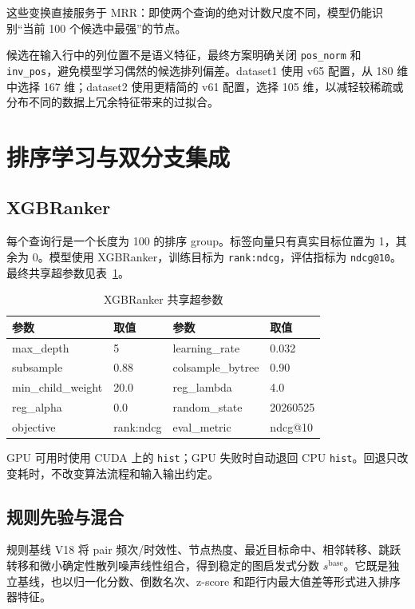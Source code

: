 \documentclass[UTF8,a4paper,11pt]{ctexart}
\begin{document}
这些变换直接服务于 MRR：即使两个查询的绝对计数尺度不同，模型仍能识别“当前 100 个候选中最强”的节点。

候选在输入行中的列位置不是语义特征，最终方案明确关闭 \texttt{pos\_norm} 和 \texttt{inv\_pos}，避免模型学习偶然的候选排列偏差。dataset1 使用 v65 配置，从 180 维中选择 167 维；dataset2 使用更精简的 v61 配置，选择 105 维，以减轻较稀疏或分布不同的数据上冗余特征带来的过拟合。

\section{排序学习与双分支集成}

\subsection{XGBRanker}

每个查询行是一个长度为 100 的排序 group。标签向量只有真实目标位置为 1，其余为 0。模型使用 XGBRanker，训练目标为 \texttt{rank:ndcg}，评估指标为 \texttt{ndcg@10}。最终共享超参数见表~\ref{tab:xgb}。

\begin{table}[htbp]
\centering
\caption{XGBRanker 共享超参数}
\label{tab:xgb}
\begin{tabular}{ll@{\qquad}ll}
\toprule
参数 & 取值 & 参数 & 取值 \\
\midrule
max\_depth & 5 & learning\_rate & 0.032 \\
subsample & 0.88 & colsample\_bytree & 0.90 \\
min\_child\_weight & 20.0 & reg\_lambda & 4.0 \\
reg\_alpha & 0.0 & random\_state & 20260525 \\
objective & rank:ndcg & eval\_metric & ndcg@10 \\
\bottomrule
\end{tabular}
\end{table}

GPU 可用时使用 CUDA 上的 \texttt{hist}；GPU 失败时自动退回 CPU \texttt{hist}。回退只改变耗时，不改变算法流程和输入输出约定。

\subsection{规则先验与混合}

规则基线 V18 将 pair 频次/时效性、节点热度、最近目标命中、相邻转移、跳跃转移和微小确定性散列噪声线性组合，得到稳定的图启发式分数 $s^{\text{base}}$。它既是独立基线，也以归一化分数、倒数名次、z-score 和距行内最大值差等形式进入排序器特征。
\end{document}
